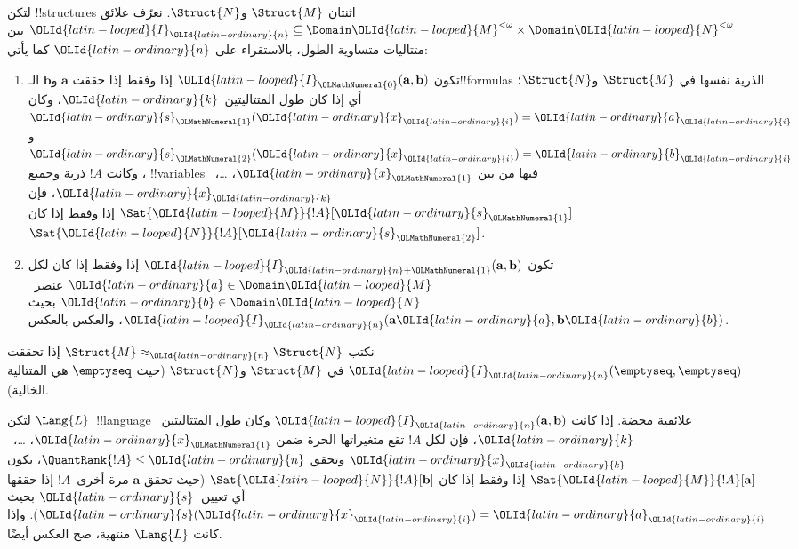 \documentclass[../../../include/open-logic-section]{subfiles}
\begin{document}
\begin{defn}
  لتكن !!{structure}s اثنتان $\Struct{M}$ و$\Struct{N}$. نعرّف علائق
  $\OLId{latin-looped}{I}_\OLId{latin-ordinary}{n} \subseteq \Domain \OLId{latin-looped}{M}^{<\omega} \times \Domain \OLId{latin-looped}{N}^{<\omega}$ بين
  متتاليات متساوية الطول، بالاستقراء على $\OLId{latin-ordinary}{n}$ كما يأتي:
   \begin{enumerate}
   \item تكون $\OLId{latin-looped}{I}_\OLMathNumeral{0}(\mathbf{a},\mathbf{b})$ إذا وفقط إذا حققت
     $\mathbf{a}$ و$\mathbf{b}$ الـ!!{formula}s الذرية نفسها في
     $\Struct{M}$ و$\Struct{N}$؛ أي إذا كان طول المتتاليتين~$\OLId{latin-ordinary}{k}$، وكان
     $\OLId{latin-ordinary}{s}_\OLMathNumeral{1}(\OLId{latin-ordinary}{x}_\OLId{latin-ordinary}{i})=\OLId{latin-ordinary}{a}_\OLId{latin-ordinary}{i}$ و$\OLId{latin-ordinary}{s}_\OLMathNumeral{2}(\OLId{latin-ordinary}{x}_\OLId{latin-ordinary}{i})=\OLId{latin-ordinary}{b}_\OLId{latin-ordinary}{i}$، وكانت $!A$ ذرية وجميع
     !!{variable}s فيها من بين $\OLId{latin-ordinary}{x}_\OLMathNumeral{1}$، \dots،~$\OLId{latin-ordinary}{x}_\OLId{latin-ordinary}{k}$، فإن
     $\Sat{\OLId{latin-looped}{M}}{!A}[\OLId{latin-ordinary}{s}_\OLMathNumeral{1}]$ إذا وفقط إذا كان $\Sat{\OLId{latin-looped}{N}}{!A}[\OLId{latin-ordinary}{s}_\OLMathNumeral{2}]$.
   \item تكون $\OLId{latin-looped}{I}_{\OLId{latin-ordinary}{n}+\OLMathNumeral{1}}(\mathbf{a},\mathbf{b})$ إذا وفقط إذا كان لكل
     $\OLId{latin-ordinary}{a}\in \Domain \OLId{latin-looped}{M}$ عنصر~$\OLId{latin-ordinary}{b}\in \Domain \OLId{latin-looped}{N}$ بحيث
     $\OLId{latin-looped}{I}_\OLId{latin-ordinary}{n}(\mathbf{a}\OLId{latin-ordinary}{a},\mathbf{b}\OLId{latin-ordinary}{b})$، والعكس بالعكس.
   \end{enumerate}
\end{defn}


\begin{defn}
  نكتب $\Struct{M} \approx_\OLId{latin-ordinary}{n} \Struct{N}$ إذا تحققت
  $\OLId{latin-looped}{I}_\OLId{latin-ordinary}{n}(\emptyseq,\emptyseq)$ في $\Struct{M}$ و$\Struct{N}$ (حيث
  $\emptyseq$ هي المتتالية الخالية).
\end{defn}

\begin{thm}
  لتكن $\Lang{L}$~!!{language} علائقية محضة. إذا كانت
  $\OLId{latin-looped}{I}_\OLId{latin-ordinary}{n}(\mathbf{a},\mathbf{b})$ وكان طول المتتاليتين~$\OLId{latin-ordinary}{k}$، فإن لكل $!A$
  تقع متغيراتها الحرة ضمن $\OLId{latin-ordinary}{x}_\OLMathNumeral{1}$، \dots،~$\OLId{latin-ordinary}{x}_\OLId{latin-ordinary}{k}$ وتحقق
  $\QuantRank{!A} \le \OLId{latin-ordinary}{n}$، يكون $\Sat{\OLId{latin-looped}{M}}{!A}[\mathbf{a}]$ إذا وفقط إذا
  كان $\Sat{\OLId{latin-looped}{N}}{!A}[\mathbf{b}]$ (حيث تحقق $\mathbf{a}$ مرة أخرى~$!A$
  إذا حققها أي تعيين~$\OLId{latin-ordinary}{s}$ بحيث $\OLId{latin-ordinary}{s}(\OLId{latin-ordinary}{x}_\OLId{latin-ordinary}{i})=\OLId{latin-ordinary}{a}_\OLId{latin-ordinary}{i}$). وإذا كانت $\Lang{L}$
  منتهية، صح العكس أيضًا.
\end{thm}
\end{document}
